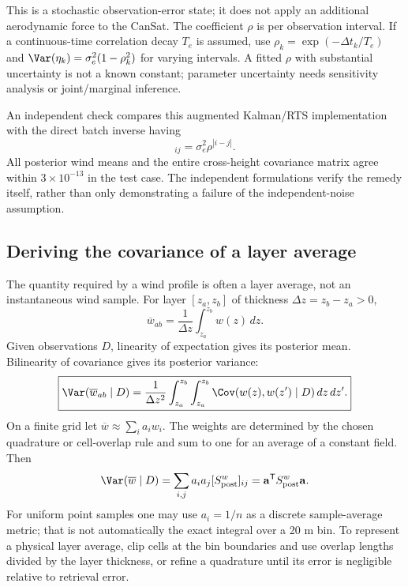 This is a stochastic observation-error state; it does not apply an additional aerodynamic force to the CanSat. The coefficient $\rho$ is per observation interval. If a continuous-time correlation decay $T_e$ is assumed, use $\rho_k=\exp(-\Delta t_k/T_e)$ and $\Var(\eta_k)=\sigma_e^2(1-\rho_k^2)$ for varying intervals. A fitted $\rho$ with substantial uncertainty is not a known constant; parameter uncertainty needs sensitivity analysis or joint/marginal inference.

An independent check compares this augmented Kalman/RTS implementation with the direct batch inverse having
\begin{equation}
 [S_\varepsilon]_{ij}=\sigma_e^2\rho^{|i-j|}.
\end{equation}
All posterior wind means and the entire cross-height covariance matrix agree within $3\times10^{-13}$ in the test case. The independent formulations verify the remedy itself, rather than only demonstrating a failure of the independent-noise assumption.

\subsection{Deriving the covariance of a layer average}
The quantity required by a wind profile is often a layer average, not an instantaneous wind sample. For layer $[z_a,z_b]$ of thickness $\Delta z=z_b-z_a>0$,
\begin{equation}
 \overline w_{ab}=\frac1{\Delta z}\int_{z_a}^{z_b}w(z)\,dz.
\end{equation}
Given observations $D$, linearity of expectation gives its posterior mean. Bilinearity of covariance gives its posterior variance:
\begin{equation}
 \boxed{\Var(\overline w_{ab}\mid D)=\frac1{\Delta z^2}
 \int_{z_a}^{z_b}\int_{z_a}^{z_b}\Cov(w(z),w(z')\mid D)\,dz\,dz'.}
\end{equation}
On a finite grid let $\overline w\approx\sum_i a_iw_i$. The weights are determined by the chosen quadrature or cell-overlap rule and sum to one for an average of a constant field. Then
\begin{equation}
 \Var(\overline w\mid D)=\sum_{i,j}a_i a_j[S^w_{\rm post}]_{ij}
 =\mathbf a^{\mathsf T}S^w_{\rm post}\mathbf a.
\end{equation}
For uniform point samples one may use $a_i=1/n$ as a discrete sample-average metric; that is not automatically the exact integral over a 20 m bin. To represent a physical layer average, clip cells at the bin boundaries and use overlap lengths divided by the layer thickness, or refine a quadrature until its error is negligible relative to retrieval error.

